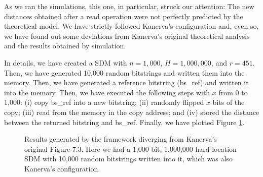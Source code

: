 As we ran the simulations, this one, in particular, struck our attention: The new distances obtained after a read operation were not perfectly predicted by the theoretical model. We have strictly followed Kanerva's configuration and, even so, we have found out some deviations from Kanerva's original theoretical analysis and the results obtained by simulation.

In details, we have created a SDM with $n=1,000$, $H=1,000,000$, and $r=451$. Then, we have generated 10,000 random bitstrings and written them into the memory. Then, we have generated a reference bitstring (bs\_ref) and written it into the memory. Then, we have executed the following steps with $x$ from 0 to 1,000: (i) copy bs\_ref into a new bitstring; (ii) randomly flipped $x$ bits of the copy; (iii) read from the memory in the copy address; and (iv) stored the distance between the returned bitstring and bs\_ref. Finally, we have plotted Figure \ref{fig:sdm-10000w-table-7-2}.

\begin{figure}[h]
\centering
{}

\caption{Results generated by the framework diverging from Kanerva's original Figure 7.3. Here we had a 1,000 bit, 1,000,000 hard location SDM with 10,000 random bitstrings written into it, which was also Kanerva's configuration.
\label{fig:sdm-10000w-table-7-2}}
\end{figure}

